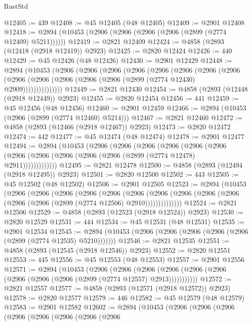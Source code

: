\begin{lexlean}{RustStd}
\begin{coremodule}
@12405 := 439
@12408 := @45 @12405 (@48 @12405)
@12409 := @2901 @12408
@12418 := @2894 (@10453 (@2906 (@2906 (@2906 (@2906 (@2899 (@2774 @12409) @5211))))))
@12419 := @2821 @12409
@12424 := @4858 (@2893 (@12418 (@2918 @12419)) @2923)
@12425 := @2820 @12424
@12426 := 440
@12429 := @45 @12426 (@48 @12426)
@12430 := @2901 @12429
@12448 := @2894
    (@10453
      (@2906
        (@2906
          (@2906
            (@2906
              (@2906
                (@2906
                  (@2906
                    (@2906
                      (@2906 (@2906 (@2906 (@2906 (@2906 (@2899 (@2774 @12430) @2909)))))))))))))))
@12449 := @2821 @12430
@12454 := @4858 (@2893 (@12448 (@2918 @12449)) @2923)
@12455 := @2820 @12454
@12456 := 441
@12459 := @45 @12456 (@48 @12456)
@12460 := @2901 @12459
@12466 := @2894 (@10453 (@2906 (@2899 (@2774 @12460) @5214)))
@12467 := @2821 @12460
@12472 := @4858 (@2893 (@12466 (@2918 @12467)) @2923)
@12473 := @2820 @12472
@12474 := 442
@12477 := @45 @12474 (@48 @12474)
@12478 := @2901 @12477
@12494 := @2894
    (@10453
      (@2906
        (@2906
          (@2906
            (@2906
              (@2906
                (@2906 (@2906 (@2906 (@2906 (@2906 (@2906 (@2899 (@2774 @12478) @2911)))))))))))))
@12495 := @2821 @12478
@12500 := @4858 (@2893 (@12494 (@2918 @12495)) @2923)
@12501 := @2820 @12500
@12502 := 443
@12505 := @45 @12502 (@48 @12502)
@12506 := @2901 @12505
@12523 := @2894
    (@10453
      (@2906
        (@2906
          (@2906
            (@2906
              (@2906
                (@2906
                  (@2906
                    (@2906 (@2906 (@2906 (@2906 (@2906 (@2899 (@2774 @12506) @2910))))))))))))))
@12524 := @2821 @12506
@12529 := @4858 (@2893 (@12523 (@2918 @12524)) @2923)
@12530 := @2820 @12529
@12531 := 444
@12534 := @45 @12531 (@48 @12531)
@12535 := @2901 @12534
@12545 := @2894 (@10453 (@2906 (@2906 (@2906 (@2906 (@2906 (@2899 (@2774 @12535) @5210)))))))
@12546 := @2821 @12535
@12551 := @4858 (@2893 (@12545 (@2918 @12546)) @2923)
@12552 := @2820 @12551
@12553 := 445
@12556 := @45 @12553 (@48 @12553)
@12557 := @2901 @12556
@12571 := @2894
    (@10453
      (@2906
        (@2906
          (@2906 (@2906 (@2906 (@2906 (@2906 (@2906 (@2906 (@2899 (@2774 @12557) @2913)))))))))))
@12572 := @2821 @12557
@12577 := @4858 (@2893 (@12571 (@2918 @12572)) @2923)
@12578 := @2820 @12577
@12579 := 446
@12582 := @45 @12579 (@48 @12579)
@12583 := @2901 @12582
@12602 := @2894
    (@10453
      (@2906
        (@2906
          (@2906
            (@2906
              (@2906
                (@2906
                  (@2906
                    (@2906

\end{coremodule}
\end{lexlean}
